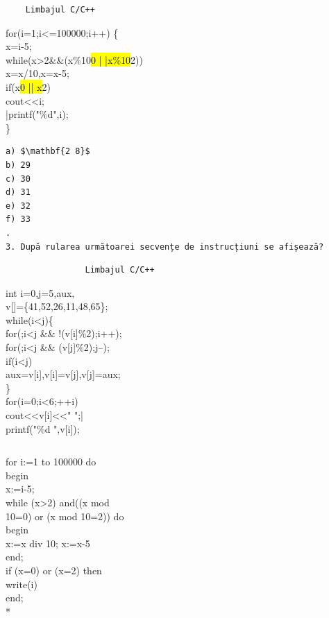 \documentclass[10pt]{article}
\begin{document}
\begin{verbatim}
    Limbajul C/C++
\end{verbatim}

for(i=1;i<=100000;i++) \{\\
x=i-5;\\
while(x>2\&\&(x\%10\hl{0 | |x\%10}2))\\
x=x/10,x=x-5;\\
if(x\hl{0 || x}2)\\
cout<<i;\\
|printf("\%d",i);\\
\}

\begin{verbatim}
a) $\mathbf{2 8}$
b) 29
c) 30
d) 31
e) 32
f) 33
.
3. După rularea următoarei secvențe de instrucțiuni se afișează?
\end{verbatim}

\begin{verbatim}
                Limbajul C/C++
\end{verbatim}

int i=0,j=5,aux,\\[0pt]
v[]=\{41,52,26,11,48,65\};\\
while(i<j)\{\\[0pt]
for(;i<j \&\& !(v[i]\%2);i++);\\[0pt]
for(;i<j \&\& (v[j]\%2);j--);\\
if(i<j)\\[0pt]
aux=v[i],v[i]=v[j],v[j]=aux;\\
\}\\
for(i=0;i<6;++i)\\[0pt]
cout<<v[i]<<" ";|\\[0pt]
printf("\%d ",v[i]);

\begin{verbatim}

\end{verbatim}

for i:=1 to 100000 do\\
begin\\
x:=i-5;\\
while (x>2) and((x mod\\
10=0) or (x mod 10=2)) do\\
begin\\
x:=x div 10; x:=x-5\\
end;\\
if (x=0) or (x=2) then\\
write(i)\\
end;\\
*
\end{document}
